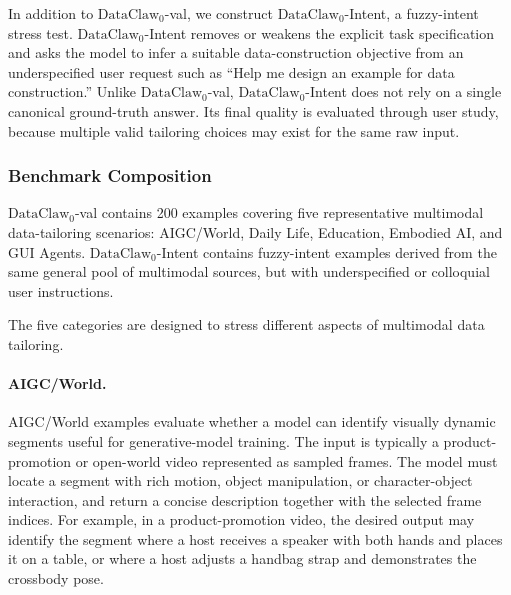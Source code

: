 \documentclass{llmxive}
\begin{document}
In addition to $\text{DataClaw}_0$-val, we construct $\text{DataClaw}_0$-Intent, a fuzzy-intent stress test. $\text{DataClaw}_0$-Intent removes or weakens the explicit task specification and asks the model to infer a suitable data-construction objective from an underspecified user request such as ``Help me design an example for data construction.'' Unlike $\text{DataClaw}_0$-val, $\text{DataClaw}_0$-Intent does not rely on a single canonical ground-truth answer. Its final quality is evaluated through user study, because multiple valid tailoring choices may exist for the same raw input.

\subsubsection{Benchmark Composition}
\label{app:benchmark_composition}

$\text{DataClaw}_0$-val contains 200 examples covering five representative multimodal data-tailoring scenarios: AIGC/World, Daily Life, Education, Embodied AI, and GUI Agents. $\text{DataClaw}_0$-Intent contains fuzzy-intent examples derived from the same general pool of multimodal sources, but with underspecified or colloquial user instructions.

The five categories are designed to stress different aspects of multimodal data tailoring.

\paragraph{AIGC/World.}
AIGC/World examples evaluate whether a model can identify visually dynamic segments useful for generative-model training. The input is typically a product-promotion or open-world video represented as sampled frames. The model must locate a segment with rich motion, object manipulation, or character-object interaction, and return a concise description together with the selected frame indices. For example, in a product-promotion video, the desired output may identify the segment where a host receives a speaker with both hands and places it on a table, or where a host adjusts a handbag strap and demonstrates the crossbody pose. 
\end{document}
